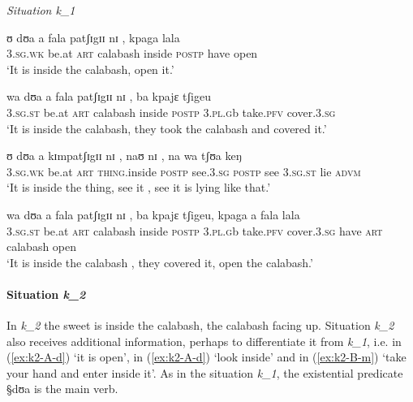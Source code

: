 \begin{exe}
\ex\label{ex:k1}\textit{Situation {\it k_{1}}}\\
 \begin{xlist}
  \ex\label{ex:k1-A-w}
\gll  ʊ dʊa a fala patʃɪgɪɪ nɪ , kpaga lala\\
\textsc{3.sg.wk} be.at \textsc{art} calabash inside \textsc{postp} {} have
open\\
\glt `It is inside the calabash, open it.'

\ex\label{ex:k1-A-d}
\gll  wa dʊa a fala patʃɪgɪɪ nɪ , ba kpajɛ tʃigeu \\
\textsc{3.sg.st} be.at \textsc{art} calabash inside \textsc{postp} {}
\textsc{3.pl.g}b take.\textsc{pfv} cover.\textsc{3.sg}\\

\glt `It is inside the calabash, they took the calabash and  covered it.'


\ex\label{ex:k1-B-t}
 \gll  ʊ dʊa a kɪmpatʃɪgɪɪ nɪ ,  naʊ nɪ , na wa tʃʊa keŋ\\
\textsc{3.sg.wk} be.at \textsc{art} \textsc{thing}.inside \textsc{postp}  {}
see.\textsc{3.sg} \textsc{postp} {} see \textsc{3.sg.st} lie  \textsc{advm}\\
 
\glt `It is inside the thing, see it , see it is lying like that.'


\ex\label{ex:k1-B-m}
\gll  wa dʊa a fala patʃɪgɪɪ nɪ , ba kpajɛ tʃigeu, kpaga a fala lala \\
\textsc{3.sg.st} be.at \textsc{art} calabash inside \textsc{postp} {}
\textsc{3.pl.g}b take.\textsc{pfv} cover.\textsc{3.sg}  have
\textsc{art}
calabash open\\

\glt `It is inside the calabash , they covered it,  open the calabash.'

\end{xlist}
\end{exe}



\paragraph{Situation {\it  k_{2}}}
\label{sec:SPA-exper1-loca}

In {\it k_{2}}   the sweet is inside the  calabash, the calabash facing up.
Situation 
{\it k_{2}} also receives additional information, perhaps to differentiate it
from 
{\it k_{1}}, i.e.  in (\ref{ex:k2-A-d}) `it is open', in  (\ref{ex:k2-A-d})
`look
inside' and in  (\ref{ex:k2-B-m}) `take your hand and enter inside it'.  
As in the situation 
{\it k_{1}}, the  existential predicate  {\S dʊa} is the main verb.


